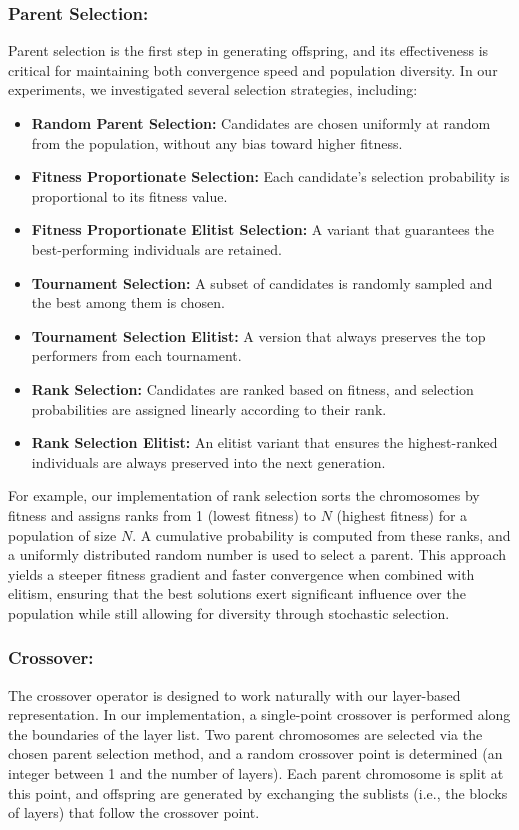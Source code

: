 \documentclass[11pt,a4paper]{article}
\begin{document}
\subsubsection*{Parent Selection:}
Parent selection is the first step in generating offspring, and its effectiveness is critical for maintaining both convergence speed and population diversity. In our experiments, we investigated several selection strategies, including:
\begin{itemize}
    \item \textbf{Random Parent Selection:} Candidates are chosen uniformly at random from the population, without any bias toward higher fitness.
    \item \textbf{Fitness Proportionate Selection:} Each candidate’s selection probability is proportional to its fitness value.
    \item \textbf{Fitness Proportionate Elitist Selection:} A variant that guarantees the best-performing individuals are retained.
    \item \textbf{Tournament Selection:} A subset of candidates is randomly sampled and the best among them is chosen.
    \item \textbf{Tournament Selection Elitist:} A version that always preserves the top performers from each tournament.
    \item \textbf{Rank Selection:} Candidates are ranked based on fitness, and selection probabilities are assigned linearly according to their rank.
    \item \textbf{Rank Selection Elitist:} An elitist variant that ensures the highest-ranked individuals are always preserved into the next generation.
\end{itemize}

For example, our implementation of rank selection sorts the chromosomes by fitness and assigns ranks from 1 (lowest fitness) to $N$ (highest fitness) for a population of size $N$. A cumulative probability is computed from these ranks, and a uniformly distributed random number is used to select a parent. This approach yields a steeper fitness gradient and faster convergence when combined with elitism, ensuring that the best solutions exert significant influence over the population while still allowing for diversity through stochastic selection.

\subsubsection*{Crossover:}
The crossover operator is designed to work naturally with our layer-based representation. In our implementation, a single-point crossover is performed along the boundaries of the layer list. Two parent chromosomes are selected via the chosen parent selection method, and a random crossover point is determined (an integer between 1 and the number of layers). Each parent chromosome is split at this point, and offspring are generated by exchanging the sublists (i.e., the blocks of layers) that follow the crossover point.\newline
\end{document}
